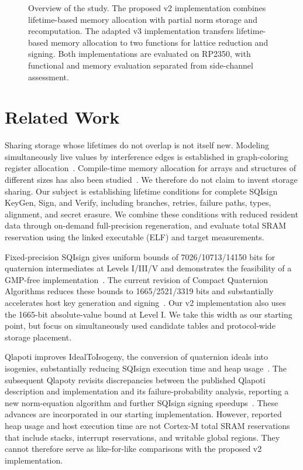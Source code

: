 \documentclass[a4paper,10pt]{article}
\theoremstyle{definition}
\theoremstyle{remark}
\begin{document}
\begin{figure}[H]
  \centering
  
  \caption{Overview of the study. The proposed v2 implementation combines lifetime-based memory allocation with partial norm storage and recomputation. The adapted v3 implementation transfers lifetime-based memory allocation to two functions for lattice reduction and signing. Both implementations are evaluated on RP2350, with functional and memory evaluation separated from side-channel assessment.}
  \label{fig:overview}
\end{figure}

\section{Related Work}
\label{sec:related-work}

Sharing storage whose lifetimes do not overlap is not itself new. Modeling simultaneously live values by interference edges is established in graph-coloring register allocation~\cite{chaitin-1981}. Compile-time memory allocation for arrays and structures of different sizes has also been studied~\cite{gergov-1999}. We therefore do not claim to invent storage sharing. Our subject is establishing lifetime conditions for complete SQIsign KeyGen, Sign, and Verify, including branches, retries, failure paths, types, alignment, and secret erasure. We combine these conditions with reduced resident data through on-demand full-precision regeneration, and evaluate total SRAM reservation using the linked executable (ELF) and target measurements.

Fixed-precision SQIsign gives uniform bounds of 7026/10713/14150 bits for quaternion intermediates at Levels I/III/V and demonstrates the feasibility of a GMP-free implementation~\cite{fixed-precision-2025}. The current revision of Compact Quaternion Algorithms reduces these bounds to 1665/2521/3319 bits and substantially accelerates host key generation and signing~\cite{compact-quaternion-2026}. Our v2 implementation also uses the 1665-bit absolute-value bound at Level I. We take this width as our starting point, but focus on simultaneously used candidate tables and protocol-wide storage placement.

Qlapoti improves IdealToIsogeny, the conversion of quaternion ideals into isogenies, substantially reducing SQIsign execution time and heap usage~\cite{qlapoti-2025,qlapoti-plus-2026}. The subsequent Qlapoty revisits discrepancies between the published Qlapoti description and implementation and its failure-probability analysis, reporting a new norm-equation algorithm and further SQIsign signing speedups~\cite{qlapoty-2026}. These advances are incorporated in our starting implementation. However, reported heap usage and host execution time are not Cortex-M total SRAM reservations that include stacks, interrupt reservations, and writable global regions. They cannot therefore serve as like-for-like comparisons with the proposed v2 implementation.
\end{document}
